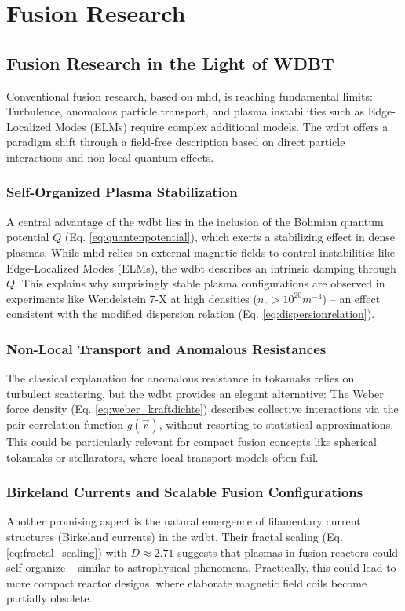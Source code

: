 \chapter{Fusion Research}
\section{Fusion Research in the Light of WDBT}
Conventional fusion research, based on \gls{mhd}, is reaching fundamental limits: Turbulence, anomalous particle transport, and plasma instabilities such as Edge-Localized Modes (ELMs) require complex additional models. The \gls{wdbt} offers a paradigm shift through a field-free description based on direct particle interactions and non-local quantum effects.

\subsection{Self-Organized Plasma Stabilization}
A central advantage of the \gls{wdbt} lies in the inclusion of the Bohmian quantum potential $Q$ (Eq. \ref{eq:quantenpotential}), which exerts a stabilizing effect in dense plasmas. While \gls{mhd} relies on external magnetic fields to control instabilities like Edge-Localized Modes (ELMs), the \gls{wdbt} describes an intrinsic damping through $Q$. This explains why surprisingly stable plasma configurations are observed in experiments like Wendelstein 7-X at high densities ($n_e > 10^{20} m^{-3}$) – an effect consistent with the modified dispersion relation (Eq. \ref{eq:dispersionrelation}).

\subsection{Non-Local Transport and Anomalous Resistances}
The classical explanation for anomalous resistance in tokamaks relies on turbulent scattering, but the \gls{wdbt} provides an elegant alternative: The Weber force density (Eq. \ref{eq:weber_kraftdichte}) describes collective interactions via the pair correlation function $g(\vec{r})$, without resorting to statistical approximations. This could be particularly relevant for compact fusion concepts like spherical tokamaks or stellarators, where local transport models often fail.

\subsection{Birkeland Currents and Scalable Fusion Configurations}
Another promising aspect is the natural emergence of filamentary current structures (Birkeland currents) in the \gls{wdbt}. Their fractal scaling (Eq. \ref{eq:fractal_scaling}) with $D \approx 2.71$ suggests that plasmas in fusion reactors could self-organize – similar to astrophysical phenomena. Practically, this could lead to more compact reactor designs, where elaborate magnetic field coils become partially obsolete.

